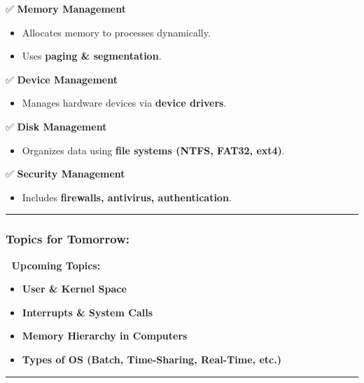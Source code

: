 \documentclass[
]{article}
\providecommand{\tightlist}{%
  \setlength{\itemsep}{0pt}\setlength{\parskip}{0pt}}
\begin{document}
✅ \textbf{Memory Management}

\begin{itemize}
\tightlist
\item
  Allocates memory to processes dynamically.
\item
  Uses \textbf{paging \& segmentation}.
\end{itemize}

✅ \textbf{Device Management}

\begin{itemize}
\tightlist
\item
  Manages hardware devices via \textbf{device drivers}.
\end{itemize}

✅ \textbf{Disk Management}

\begin{itemize}
\tightlist
\item
  Organizes data using \textbf{file systems (NTFS, FAT32, ext4)}.
\end{itemize}

✅ \textbf{Security Management}

\begin{itemize}
\tightlist
\item
  Includes \textbf{firewalls, antivirus, authentication}.
\end{itemize}

\begin{center}\rule{0.5\linewidth}{0.5pt}\end{center}

\subsubsection{\texorpdfstring{\textbf{Topics for
Tomorrow:}}{Topics for Tomorrow:}}\label{topics-for-tomorrow}

📌 \textbf{Upcoming Topics:}

\begin{itemize}
\tightlist
\item
  \textbf{User \& Kernel Space}
\item
  \textbf{Interrupts \& System Calls}
\item
  \textbf{Memory Hierarchy in Computers}
\item
  \textbf{Types of OS (Batch, Time-Sharing, Real-Time, etc.)}
\end{itemize}

\begin{center}\rule{0.5\linewidth}{0.5pt}\end{center}
\end{document}
